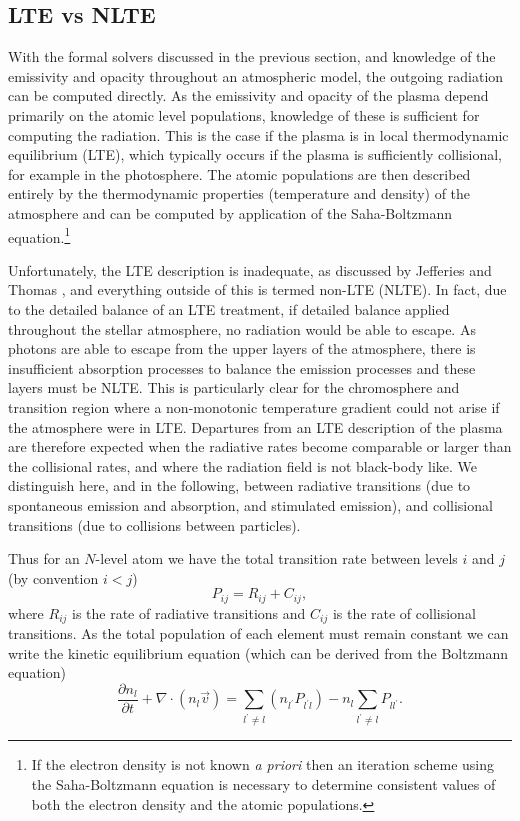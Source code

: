 \subsection{LTE vs NLTE}


With the formal solvers discussed in the previous section, and knowledge of the emissivity and opacity throughout an atmospheric model, the outgoing radiation can be computed directly. As the emissivity and opacity of the plasma depend primarily on the atomic level populations, knowledge of these is sufficient for computing the radiation.
This is the case if the plasma is in local thermodynamic equilibrium (LTE), which typically occurs if the plasma is sufficiently collisional, for example in the photosphere. The atomic populations are then described entirely by the thermodynamic properties (temperature and density) of the atmosphere and can be computed by application of the Saha-Boltzmann equation.\footnote{If the electron density is not known \textit{a priori} then an iteration scheme using the Saha-Boltzmann equation is necessary to determine consistent values of both the electron density and the atomic populations.}

Unfortunately, the LTE description is inadequate, as discussed by Jefferies and Thomas \NeedRef{}, and everything outside of this is termed non-LTE (NLTE). In fact, due to the detailed balance of an LTE treatment, if detailed balance applied throughout the stellar atmosphere, no radiation would be able to escape. As photons are able to escape from the upper layers of the atmosphere, there is insufficient absorption processes to balance the emission processes and these layers must be NLTE. This is particularly clear for the chromosphere and transition region where a non-monotonic temperature gradient could not arise if the atmosphere were in LTE.
Departures from an LTE description of the plasma are therefore expected when the radiative rates become comparable or larger than the collisional rates, and where the radiation field is not black-body like.
We distinguish here, and in the following, between radiative transitions (due to spontaneous emission and absorption, and stimulated emission), and collisional transitions (due to collisions between particles).

Thus for an $N$-level atom we have the total transition rate between levels $i$ and $j$ (by convention $i < j$)
\begin{equation}
    P_{ij} = R_{ij} + C_{ij},
\end{equation}
where $R_{ij}$ is the rate of radiative transitions and $C_{ij}$ is the rate of collisional transitions.
As the total population of each element must remain constant we can write the kinetic equilibrium equation (which can be derived from the Boltzmann equation)
\begin{equation}
    \frac{\partial n_l}{\partial t} + \nabla \cdot (n_l \vec{v}) = \sum_{l^\prime\neq l} (n_{l^\prime} P_{l^\prime l}) - n_l \sum_{l^\prime\neq l} P_{ll^\prime}.
    \label{Eq:KinEq}
\end{equation}

